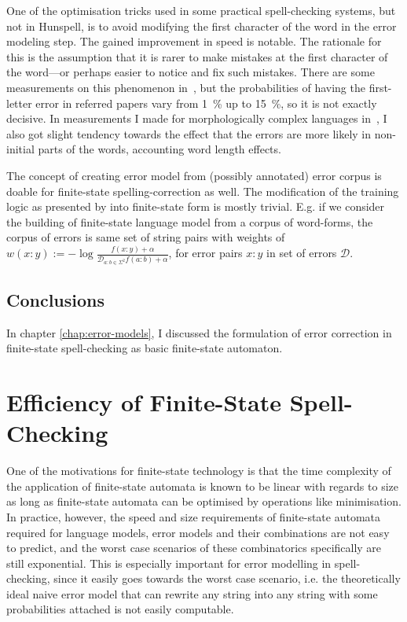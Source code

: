 \documentclass[officiallayout,draft]{unihelcompling}
\begin{document}
One of the optimisation tricks used in some practical spell-checking systems,
but not in Hunspell, is to avoid modifying the first character of the word in
the error modeling step. The gained improvement in speed is notable. The
rationale for this is the assumption that it is rarer to make mistakes at the
first character of the word---or perhaps easier to notice and fix such
mistakes. There are some measurements on this phenomenon
in~\citet{bhagat2007spelling}, but the probabilities of having the first-letter
error in referred papers vary from 1~\% up to 15~\%, so it is not
exactly decisive. In measurements I made for morphologically complex languages
in~, I also got slight tendency towards the
effect that the errors are more likely in non-initial parts of the words,
accounting word length effects.

The concept of creating error model from (possibly annotated) error corpus is
doable for finite-state spelling-correction as well. The modification of the
training logic as presented by \citep{church1991probability} into finite-state
form is mostly trivial. E.g. if we consider the building of finite-state
language model from a corpus of word-forms, the corpus of errors is same set of
string pairs with weights of $w(x:y) := -\log\frac{f(x:y) +
\alpha}{\mathcal{D}_{a:b \in \Sigma^2} f(a:b) + \alpha}$, for error pairs $x:y$
in set of errors $\mathcal{D}$.

\section{Conclusions}

In chapter \ref{chap:error-models}, I discussed the formulation of error
correction in finite-state spell-checking as basic finite-state automaton. 

\chapter{Efficiency of Finite-State Spell-Checking}
\label{chap:efficiency}

One of the motivations for finite-state technology is that the time complexity
of the application of finite-state automata is known to be linear with regards
to size as long as finite-state automata can be optimised by operations like
minimisation. In practice, however, the speed and size requirements of
finite-state automata required for language models, error models and their
combinations are not easy to predict, and the worst case scenarios of these
combinatorics specifically are still exponential. This is especially important
for error modelling in spell-checking, since it easily goes towards the worst
case scenario, i.e. the theoretically ideal naive error model that can rewrite
any string into any string with some probabilities attached is not easily
computable.
\end{document}
